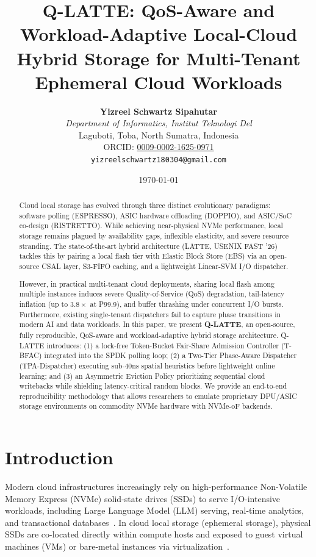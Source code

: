 \documentclass[10pt,twocolumn]{article}
\title{\textbf{\Large Q-LATTE: QoS-Aware and Workload-Adaptive Local-Cloud Hybrid Storage for Multi-Tenant Ephemeral Cloud Workloads}}
\author{
    \textbf{Yizreel Schwartz Sipahutar}\\
    \textit{Department of Informatics, Institut Teknologi Del}\\
    Laguboti, Toba, North Sumatra, Indonesia\\
    ORCID: \href{https://orcid.org/0009-0002-1625-0971}{0009-0002-1625-0971}\\
    \texttt{yizreelschwartz180304@gmail.com}
}
\date{\today}
\begin{document}
\maketitle

\begin{abstract}
Cloud local storage has evolved through three distinct evolutionary paradigms: software polling (ESPRESSO), ASIC hardware offloading (DOPPIO), and ASIC/SoC co-design (RISTRETTO). While achieving near-physical NVMe performance, local storage remains plagued by availability gaps, inflexible elasticity, and severe resource stranding. The state-of-the-art hybrid architecture (LATTE, USENIX FAST '26) tackles this by pairing a local flash tier with Elastic Block Store (EBS) via an open-source CSAL layer, S3-FIFO caching, and a lightweight Linear-SVM I/O dispatcher. 

However, in practical multi-tenant cloud deployments, sharing local flash among multiple instances induces severe Quality-of-Service (QoS) degradation, tail-latency inflation (up to $3.8\times$ at P99.9), and buffer thrashing under concurrent I/O bursts. Furthermore, existing single-tenant dispatchers fail to capture phase transitions in modern AI and data workloads. In this paper, we present \textbf{Q-LATTE}, an open-source, fully reproducible, QoS-aware and workload-adaptive hybrid storage architecture. Q-LATTE introduces: (1) a lock-free Token-Bucket Fair-Share Admission Controller (T-BFAC) integrated into the SPDK polling loop; (2) a Two-Tier Phase-Aware Dispatcher (TPA-Dispatcher) executing sub-40ns spatial heuristics before lightweight online learning; and (3) an Asymmetric Eviction Policy prioritizing sequential cloud writebacks while shielding latency-critical random blocks. We provide an end-to-end reproducibility methodology that allows researchers to emulate proprietary DPU/ASIC storage environments on commodity NVMe hardware with NVMe-oF backends.
\end{abstract}

\section{Introduction}
Modern cloud infrastructures increasingly rely on high-performance Non-Volatile Memory Express (NVMe) solid-state drives (SSDs) to serve I/O-intensive workloads, including Large Language Model (LLM) serving, real-time analytics, and transactional databases~\cite{yang2026here, zhang2024ebs}. In cloud local storage (ephemeral storage), physical SSDs are co-located directly within compute hosts and exposed to guest virtual machines (VMs) or bare-metal instances via virtualization~\cite{bjorling2021zns, hwang2021rearchitecting}.
\end{document}
